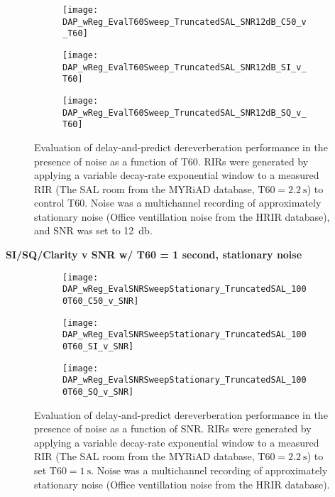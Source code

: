 \begin{figure}[H]
	\centering
	\begin{subfigure}[b]{0.47\textwidth}
		\centering
		\texttt{[image: DAP\_wReg\_EvalT60Sweep\_TruncatedSAL\_SNR12dB\_C50\_v\_T60]}
	\end{subfigure}
	\begin{subfigure}[b]{0.92\textwidth}
		\centering
		\texttt{[image: DAP\_wReg\_EvalT60Sweep\_TruncatedSAL\_SNR12dB\_SI\_v\_T60]}
	\end{subfigure}
	\begin{subfigure}[b]{0.92\textwidth}
		\centering
		\texttt{[image: DAP\_wReg\_EvalT60Sweep\_TruncatedSAL\_SNR12dB\_SQ\_v\_T60]}
	\end{subfigure}
	\caption{Evaluation of delay-and-predict dereverberation performance in the presence of noise as a function of T60. RIRs were generated by applying a variable decay-rate exponential window to a measured RIR (The SAL room from the MYRiAD database, $\mathrm{T60} =\qty{2.2}{\second}$) to control T60. Noise was a multichannel recording of approximately stationary noise (Office ventillation noise from the HRIR database), and SNR was set to \qty{12}{\decibel}.}
	\label{fig:DAP_EvalT60Sweep_TruncatedSAL_SNR12dB}
\end{figure}

\textbf{SI/SQ/Clarity v SNR w/ T60 = 1 second, stationary noise}

\begin{figure}[H]
	\centering
	\begin{subfigure}[b]{0.47\textwidth}
		\centering
		\texttt{[image: DAP\_wReg\_EvalSNRSweepStationary\_TruncatedSAL\_1000T60\_C50\_v\_SNR]}
	\end{subfigure}
	\begin{subfigure}[b]{0.92\textwidth}
		\centering
		\texttt{[image: DAP\_wReg\_EvalSNRSweepStationary\_TruncatedSAL\_1000T60\_SI\_v\_SNR]}
	\end{subfigure}
	\begin{subfigure}[b]{0.92\textwidth}
		\centering
		\texttt{[image: DAP\_wReg\_EvalSNRSweepStationary\_TruncatedSAL\_1000T60\_SQ\_v\_SNR]}
	\end{subfigure}
	\caption{Evaluation of delay-and-predict dereverberation performance in the presence of noise as a function of SNR. RIRs were generated by applying a variable decay-rate exponential window to a measured RIR (The SAL room from the MYRiAD database, $\mathrm{T60} = \qty{2.2}{\second}$) to set $\mathrm{T60} = \qty{1}{\second}$. Noise was a multichannel recording of approximately stationary noise (Office ventillation noise from the HRIR database).}
	\label{fig:DAP_wReg_EvalSNRSweepStationary_TruncatedSAL_1000T60}
\end{figure}

